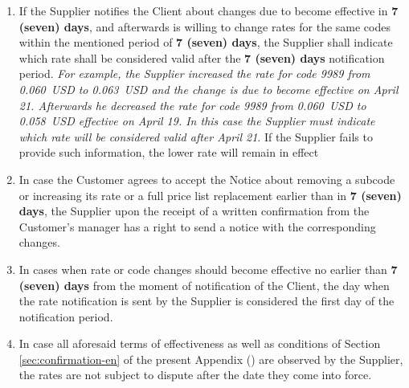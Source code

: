\begin{Form}
\begin{enumerate}[label=\thesection.\arabic*.]
  \item If the Supplier notifies the Client about changes due to become effective in
        \textbf{7 (seven) days}, and afterwards is willing to change rates for the same codes within
        the mentioned period of \textbf{7 (seven) days}, the Supplier shall indicate which rate shall
        be considered valid after the \textbf{7 (seven) days} notification period. \textit{For example,
        the Supplier increased the rate for code 9989 from 0.060~USD
        to 0.063~USD and the change is due to become effective on April 21.
        Afterwards he decreased the rate for code 9989 from 0.060~USD to 0.058~USD
        effective on April 19. In this case the Supplier must indicate which rate will be considered
        valid after April 21}.
        If the Supplier fails to provide such information, the lower rate will remain in effect
  \item In case the Customer agrees to accept the Notice about removing a subcode or increasing its
        rate or a full price list replacement earlier than in \textbf{7 (seven) days}, the Supplier upon the receipt
        of a written confirmation from the Customer's manager has a right to send a notice with the
        corresponding changes.
  \item In cases when rate or code changes should become effective no earlier than \textbf{7 (seven) days}
       from the moment of notification of the Client, the day when the rate notification is sent
        by the Supplier is considered the first day of the notification period.
  \item In case all aforesaid terms of effectiveness as well as conditions of Section \ref{sec:confirmation-en}
        of the present Appendix (\flqq{}\frqq{}) are observed by the Supplier,
        the rates are not subject to dispute after the date they come into force.
  \end{enumerate}



\end{Form}
